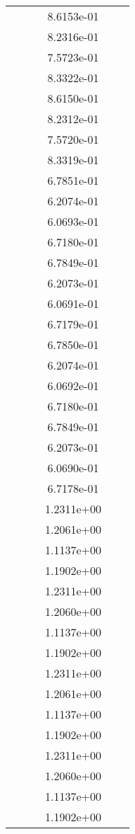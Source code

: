 \begin{xltabular}{\textwidth}{r|rS[table-format=1.3e+2]S[table-format=1.4e+2]S[table-format=1.4e+2]S[table-format=-1.5]}
&  &  & 8.6153e-01 & & \\
&  &  & 8.2316e-01 & & \\
&  &  & 7.5723e-01 & & \\
&  &  & 8.3322e-01 & & \\
&  &  & 8.6150e-01 & & \\
&  &  & 8.2312e-01 & & \\
&  &  & 7.5720e-01 & & \\
&  &  & 8.3319e-01 & & \\
&  &  & 6.7851e-01 & & \\
&  &  & 6.2074e-01 & & \\
&  &  & 6.0693e-01 & & \\
&  &  & 6.7180e-01 & & \\
&  &  & 6.7849e-01 & & \\
&  &  & 6.2073e-01 & & \\
&  &  & 6.0691e-01 & & \\
&  &  & 6.7179e-01 & & \\
&  &  & 6.7850e-01 & & \\
&  &  & 6.2074e-01 & & \\
&  &  & 6.0692e-01 & & \\
&  &  & 6.7180e-01 & & \\
&  &  & 6.7849e-01 & & \\
&  &  & 6.2073e-01 & & \\
&  &  & 6.0690e-01 & & \\
&  &  & 6.7178e-01 & & \\
&  &  & 1.2311e+00 & & \\
&  &  & 1.2061e+00 & & \\
&  &  & 1.1137e+00 & & \\
&  &  & 1.1902e+00 & & \\
&  &  & 1.2311e+00 & & \\
&  &  & 1.2060e+00 & & \\
&  &  & 1.1137e+00 & & \\
&  &  & 1.1902e+00 & & \\
&  &  & 1.2311e+00 & & \\
&  &  & 1.2061e+00 & & \\
&  &  & 1.1137e+00 & & \\
&  &  & 1.1902e+00 & & \\
&  &  & 1.2311e+00 & & \\
&  &  & 1.2060e+00 & & \\
&  &  & 1.1137e+00 & & \\
&  &  & 1.1902e+00 & & \\

\end{xltabular}
